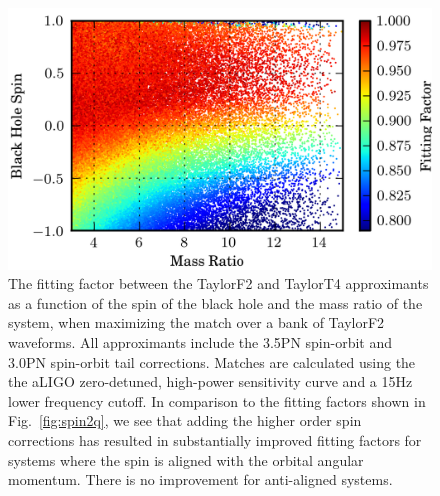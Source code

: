 \begin{figure}
\begin{center}
\includegraphics{papers/nsbh_faithfulness/figure14.png}
\end{center}
\caption{\label{fig:spin2q7}The fitting factor between the TaylorF2 and
TaylorT4 approximants as a function of the spin of the black hole
and the mass ratio of the system, when maximizing the match over a bank of
TaylorF2 waveforms. All approximants include the 3.5\ac{PN} spin-orbit and 3.0\ac{PN} 
spin-orbit tail corrections. 
Matches are calculated using the the aLIGO
zero-detuned, high-power sensitivity curve and a 15Hz lower frequency cutoff. In 
comparison to the fitting factors shown in Fig.~\ref{fig:spin2q}, we see that adding
the higher order spin corrections has resulted in substantially improved fitting factors for 
systems where the spin is aligned with the orbital angular momentum. There is no 
improvement for anti-aligned systems.
}
\end{figure}


